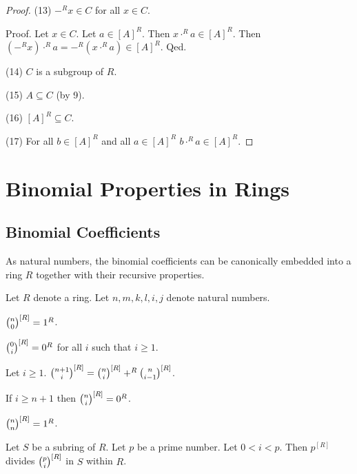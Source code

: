 \documentclass[11pt]{article}
\begin{document}
\begin{forthel}
\begin{proof}
(13) $-^{R} x \in C$ for all $x \in C$.

Proof.
Let $x \in C$.
Let $a \in [A]^{R}$. Then $x \cdot^{R} a \in [A]^{R}$.
Then $(-^{R} x) \cdot^{R} a = -^{R} (x\cdot^{R} a) \in [A]^{R}$.
Qed.

(14) $C$ is a subgroup of $R$.

(15) $A \subseteq C$ (by 9). 

(16) $[A]^{R} \subseteq C$.

(17) For all $b \in [A]^{R}$ and all $a \in [A]^{R}$ $b \cdot^{R} a \in [A]^{R}$.

\end{proof}
\end{forthel}

\section{Binomial Properties in Rings}

\subsection{Binomial Coefficients}

As natural numbers, the binomial coefficients can be 
canonically embedded 
into a ring $R$ together with their recursive properties.

\begin{forthel}

Let $R$ denote a ring.
Let $n,m,k,l,i,j$ denote natural numbers.

\begin{lemma}
${n \choose 0}^{[R]} = 1^{R}$.
\end{lemma}

\begin{lemma}
${0 \choose i}^{[R]} = 0^{R}$ for all $i$ such that $i \geq 1$.
\end{lemma}

\begin{lemma} Let $i \geq 1$.
${n+1 \choose i}^{[R]} = {n \choose i}^{[R]} +^{R} {n \choose i-1}^{[R]}$.
\end{lemma}

\begin{lemma}
If $i \geq n + 1$ then ${n \choose i}^{[R]} = 0^{R}$.
\end{lemma}

\begin{theorem} 
${n \choose n}^{[R]} = 1^{R}$.
\end{theorem}

\begin{lemma} Let $S$ be a subring of $R$.
Let $p$ be a prime number.
Let $0 < i < p$. Then
$p^{[R]}$ divides ${p \choose i}^{[R]}$ in $S$ within $R$.
\end{lemma}

\end{forthel}
\end{document}
